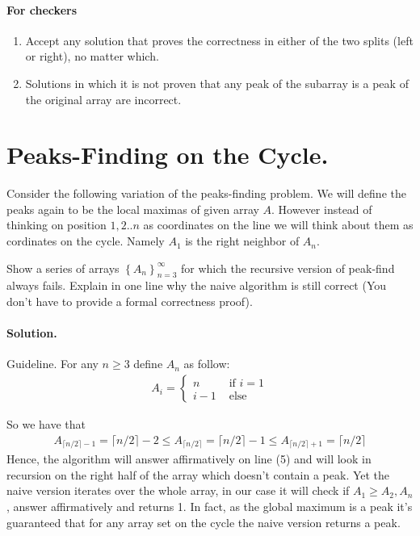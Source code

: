 \ifdefined\CHECK 
\paragraph{For checkers}

\begin{enumerate}
  \item Accept any solution that proves the correctness in either of the two splits (left or right), no matter which.
  \item Solutions in which it is not proven that any peak of the subarray is a peak of the original array are incorrect.
\end{enumerate}
\fi

\section{Peaks-Finding on the Cycle.} Consider the following variation of the peaks-finding problem. We will define the peaks again to be the local maximas of given array $A$. However instead of thinking on position ${1,2..n}$ as coordinates on the line we will think about them as cordinates on the cycle. Namely $A_{1}$ is the right neighbor of $A_{n}$. 


Show a series of arrays $\left\{ A_{n} \right\}_{n=3}^{\infty}$ for which the recursive version of peak-find always fails. Explain in one line why the naive algorithm is still correct (You don't have to provide a formal correctness proof).


\ifdefined\SOLUTION
  \paragraph{Solution.} Guideline. For any $n \ge 3$ define $A_{n}$ as follow:
\begin{equation*}
  \begin{split}
    A_{i} = \begin{cases}
      n & \text{ if } i = 1 \\
      i - 1 & \text{ else } 
    \end{cases}
  \end{split}
\end{equation*}

So we have that 
\begin{equation*}
  \begin{split}
    A_{\lceil n/2 \rceil - 1 } = \lceil n/2 \rceil - 2 \le A_{\lceil n/2 \rceil } = \lceil n/2 \rceil - 1 \le A_{\lceil n/2 \rceil + 1 } = \lceil n/2 \rceil  
  \end{split}
\end{equation*}
Hence, the algorithm will answer affirmatively on line (5) and will look in recursion on the right half of the array which doesn't contain a peak. Yet the naive version iterates over the whole array, in our case it will check if $A_{1} \ge A_{2},A_{n}$, answer affirmatively and returns 1. In fact, as the global maximum is a peak it's guaranteed that for any array set on the cycle the naive version returns a peak.




